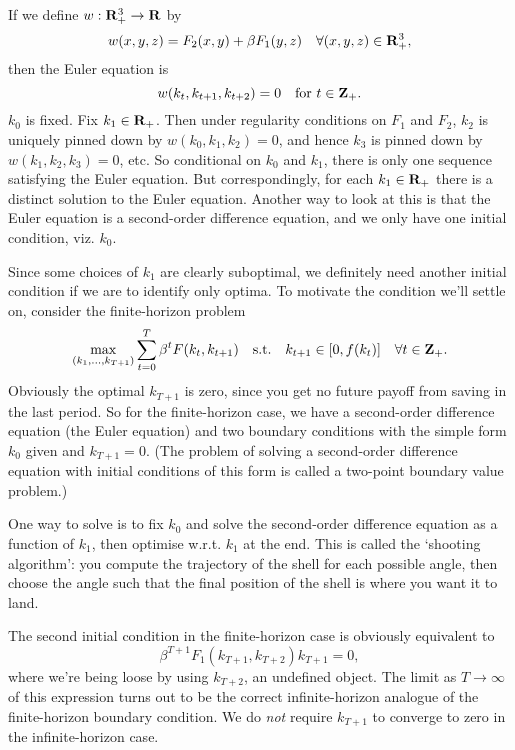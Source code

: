 \documentclass[11pt,letterpaper,reqno,oneside]{article}
\begin{document}
If we define $w : \mathbf{R}_+^3 \to \mathbf{R}$ by
%
\begin{equation*}
	w(x,y,z) = F_2(x,y) + \beta F_1(y,z) 
	\quad\forall (x,y,z) \in \mathbf{R}_+^3 ,
\end{equation*}
%
then the Euler equation is
%
\begin{equation*}
	w(k_t,k_{t+1},k_{t+2}) = 0 \quad\text{for $t \in \mathbf{Z}_+$} .
\end{equation*}
%
$k_0$ is fixed. Fix $k_1 \in \mathbf{R}_+$. Then under regularity conditions on $F_1$ and $F_2$, $k_2$ is uniquely pinned down by $w(k_0,k_1,k_2) = 0$, and hence $k_3$ is pinned down by $w(k_1,k_2,k_3) = 0$, etc. So conditional on $k_0$ and $k_1$, there is only one sequence satisfying the Euler equation. But correspondingly, for each $k_1 \in \mathbf{R}_+$ there is a distinct solution to the Euler equation. Another way to look at this is that the Euler equation is a second-order difference equation, and we only have one initial condition, viz. $k_0$.

Since some choices of $k_1$ are clearly suboptimal, we definitely need another initial condition if we are to identify only optima. To motivate the condition we'll settle on, consider the finite-horizon problem
%
\begin{equation*}
	\max_{(k_1,\dots,k_{T+1})} \sum_{t=0}^T \beta^t F( k_t, k_{t+1} )
	\quad\text{s.t.}\quad 
	k_{t+1} \in [0,f(k_t)] \quad \forall t \in \mathbf{Z}_+ .
\end{equation*}
%
Obviously the optimal $k_{T+1}$ is zero, since you get no future payoff from saving in the last period. So for the finite-horizon case, we have a second-order difference equation (the Euler equation) and two boundary conditions with the simple form $k_0$ given and $k_{T+1}=0$. (The problem of solving a second-order difference equation with initial conditions of this form is called a two-point boundary value problem.)

One way to solve is to fix $k_0$ and solve the second-order difference equation as a function of $k_1$, then optimise w.r.t. $k_1$ at the end. This is called the `shooting algorithm': you compute the trajectory of the shell for each possible angle, then choose the angle such that the final position of the shell is where you want it to land.

The second initial condition in the finite-horizon case is obviously equivalent to 
%
\begin{equation*}
	\beta^{T+1} F_1(k_{T+1},k_{T+2}) k_{T+1} = 0 ,
\end{equation*}
%
where we're being loose by using $k_{T+2}$, an undefined object. The limit as $T \to \infty$ of this expression turns out to be the correct infinite-horizon analogue of the finite-horizon boundary condition. We do \emph{not} require $k_{T+1}$ to converge to zero in the infinite-horizon case.
\end{document}
